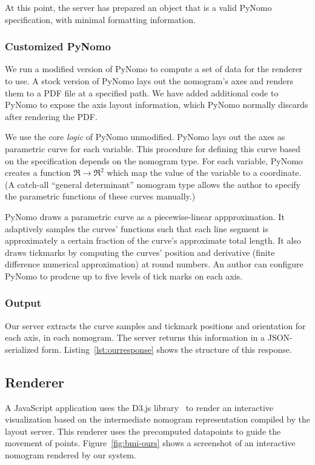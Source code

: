 \documentclass{proc}
\begin{document}
At this point, the server has prepared an object that is a valid
PyNomo specification, with minimal formatting information.

\subsubsection{Customized PyNomo}
We run a modified version of PyNomo to compute a set of data for the
renderer to use.
A stock version of PyNomo lays out the nomogram's axes and renders
them to a PDF file at a specified path.
We have added additional code to PyNomo to expose the axis layout
information, which PyNomo normally discards after rendering the PDF.

We use the core \emph{logic} of PyNomo unmodified.
PyNomo lays out the axes as parametric curve for each variable.
This procedure for defining this curve based on the specification
depends on the nomogram type.
For each variable, PyNomo creates a function
$\Re\rightarrow\Re^2$ which map the value of the variable to a
coordinate.
(A catch-all ``general determinant'' nomogram type allows the author
to specify the parametric functions of these curves manually.)

PyNomo draws a parametric curve as a piecewise-linear appproximation.
It adaptively samples the curves' functions such that each line
segment is approximately a certain fraction of the curve's approximate
total length.
It also draws tickmarks by computing the curves' position and
derivative (finite difference numerical approximation) at round
numbers.
An author can configure PyNomo to prodcue up to five levels of tick
marks on each axis.

\subsubsection{Output}
Our server extracts the curve samples and tickmark positions and
orientation for each axis, in each nomogram.
The server returns this information in a JSON-serialized form.
Listing~\ref{lst:ourresponse} shows the structure of this response.


\subsection{Renderer}
A JavaScript application uses the D3.js library~\cite{d3js} to render
an interactive visualization based on the intermediate nomogram
representation compiled by the layout server.
This renderer uses the precomputed datapoints to guide the movement of
points.
Figure~\ref{fig:bmi-ours} shows a screenshot of an interactive
nomogram rendered by our system.
\end{document}
